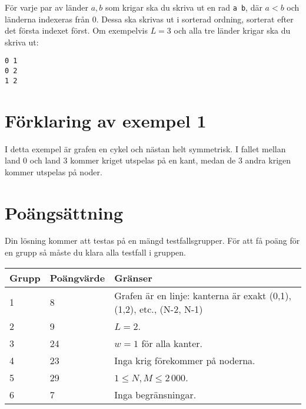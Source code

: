 För varje par av länder $a, b$ som krigar ska du skriva ut en rad \texttt{a b}, där $a < b$ och länderna indexeras från 0.
Dessa ska skrivas ut i sorterad ordning, sorterat efter det första indexet först.
Om exempelvis $L = 3$ och alla tre länder krigar ska du skriva ut:
\begin{lstlisting}
0 1
0 2
1 2
\end{lstlisting}

\section*{Förklaring av exempel 1}

I detta exempel är grafen en cykel och nästan helt symmetrisk. I fallet mellan
land 0 och land 3 kommer kriget utspelas på en kant, medan de 3 andra krigen
kommer utspelas på noder.

\section*{Poängsättning}
Din lösning kommer att testas på en mängd testfallsgrupper. För att få poäng för en grupp
så måste du klara alla testfall i gruppen.

\noindent
\begin{tabular}{| l | l | l |}
\hline
Grupp & Poängvärde & Gränser \\ \hline
1     & 8          & Grafen är en linje: kanterna är exakt (0,1), (1,2), etc., (N-2, N-1) \\ \hline
2     & 9          & $L = 2$. \\ \hline
3     & 24         & $w = 1$ för alla kanter. \\ \hline
4     & 23         & Inga krig förekommer på noderna. \\ \hline
5     & 29         & $1 \le N, M \le 2\,000$. \\ \hline
6     & 7          & Inga begränsningar. \\ \hline
\end{tabular}

